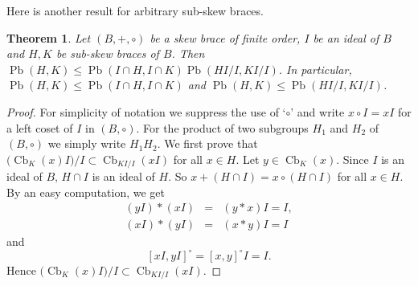 \documentclass[10pt,a4paper]{amsart}
\numberwithin{equation}{section}
\newtheorem{thm}[equation]{Theorem}
\newcommand{\Cb}{\operatorname{Cb} }
\newcommand{\Pb}{\operatorname{Pb} }
\begin{document}
Here is another result for arbitrary sub-skew braces.
\begin{thm} %
    Let $(B,+, \circ)$ be a skew brace of finite order,  $I$ be an ideal of $B$ and $H,K$ be sub-skew braces of $B$. Then $\Pb(H,K)\leqslant \Pb(I\cap H, I\cap K)\Pb(HI/I,KI/I)$. In particular, $\Pb(H,K)\leqslant \Pb(I\cap H, I\cap K)$ and $\Pb(H,K) \leqslant \Pb(HI/I,KI/I)$.
\end{thm}
\begin{proof}
     For simplicity of notation we suppress the use of `$\circ$' and write $x \circ I = xI$ for a left coset of $I$ in $(B, \circ)$. For the product of two subgroups $H_1$ and $H_2$  of $(B, \circ)$ we simply write $H_1 H_2$.
 We first prove that $({\Cb_{K}(x)  I)/I} \subset \Cb_{KI/I}(x  I)$ for all $x\in H$. Let $y \in \Cb_{K}(x)$. Since $I$ is an ideal of $B$, $H\cap I$ is an ideal of $H$. So $x + (H\cap I) = x \circ (H \cap I)$ for all $x \in H$. By an easy computation, we get
 \begin{eqnarray*}
(y  I) * (x  I) &=& (y*x)  I  = I,\\
  (x  I) * (y  I) &=& (x*y)  I  = I  
  \end{eqnarray*}
  and 
  $$[x I, y  I]^{\circ} = [x, y]^{\circ}  I  = I.$$
Hence $({\Cb_{K}(x)  I)/I} \subset \Cb_{KI/I}(x  I)$.


\end{proof}
\end{document}
